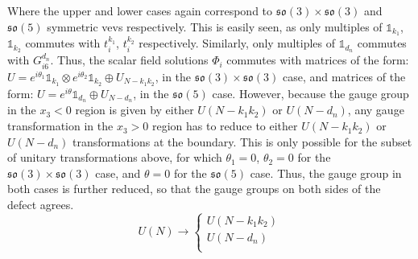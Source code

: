 Where the upper and lower cases again correspond to $\mathfrak{so}(3) \times \mathfrak{so}(3)$ and $\mathfrak{so}(5)$ symmetric vevs respectively. This is easily seen, as only multiples of $\mathbb{1}_{k_1}$, $\mathbb{1}_{k_2}$ commutes with $t_i^{k_1}$, $t_i^{k_2}$ respectively. Similarly, only multiples of $\mathbb{1}_{d_n}$ commutes with $G_{i6}^{d_n}$. Thus, the scalar field solutions $\Phi_i$ commutes with matrices of the form: $U = e^{i \theta_1} \mathbb{1}_{k_1} \otimes e^{i \theta_2} \mathbb{1}_{k_2} \oplus U_{N - k_1 k_2}$, in the $\mathfrak{so}(3) \times \mathfrak{so}(3)$ case, and matrices of the form: $U = e^{i \theta} \mathbb{1}_{d_n} \oplus U_{N - d_n}$, in the $\mathfrak{so}(5)$ case. However, because the gauge group in the $x_3 < 0$ region is given by either $U(N - k_1 k_2)$ or $U(N - d_n)$, any gauge transformation in the $x_3 > 0$ region has to reduce to either $U(N - k_1 k_2)$ or $U(N - d_n)$ transformations at the boundary. This is only possible for the subset of unitary transformations above, for which $\theta_1 = 0$, $\theta_2 = 0$ for the $\mathfrak{so}(3) \times \mathfrak{so}(3)$ case, and $\theta = 0$ for the $\mathfrak{so}(5)$ case. Thus, the gauge group in both cases is further reduced, so that the gauge groups on both sides of the defect agrees.
%
%
\begin{equation}
U(N) \to
\begin{cases}
	U(N - k_1 k_2) \\
	U(N - d_n) \\
\end{cases}
\end{equation}
%
%

